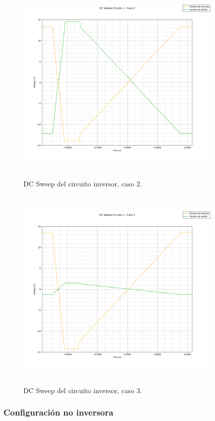 \begin{figure}[H] %
	\centering
	\includegraphics[width=10cm,height=10cm,keepaspectratio]{../EJ1/00GRAFICOS/c1dcs/c1c2dcs.png}
	\caption{DC Sweep del circuito inversor, caso 2.}
	\label{c1c2dcs}
\end{figure}

\begin{figure}[H] %
	\centering
	\includegraphics[width=10cm,height=10cm,keepaspectratio]{../EJ1/00GRAFICOS/c1dcs/c1c3dcs.png}
	\caption{DC Sweep del circuito inversor, caso 3.}
	\label{c1c2dcs}
\end{figure}

\subsubsection*{Configuraci\'on no inversora} %

